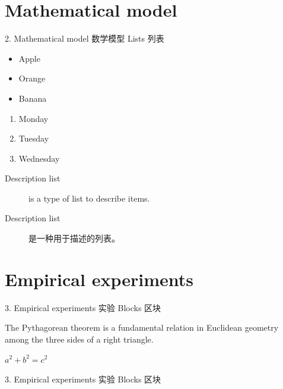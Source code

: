 \documentclass[CJKutf8]{beamer}
\begin{document}
\begin{CJK*}{UTF8}{gbsn}
  \section{Mathematical model}
  \label{Sec:model}
  \begin{frame}{2. Mathematical model 数学模型}
    Lists 列表

    \begin{itemize}
    \item Apple
    \item Orange
    \item Banana
    \end{itemize}

    \begin{enumerate}
    \item Monday
    \item Tuesday
    \item Wednesday
    \end{enumerate}

    \begin{description}
    \item[Description list] is a type of list to describe items.
    \item[Description list] 是一种用于描述的列表。
    \end{description}
  \end{frame} %

  \section{Empirical experiments}
  \label{Sec:experiments}
  \begin{frame}{3. Empirical experiments 实验}
    Blocks 区块

      \begin{definition}
        The Pythagorean theorem is a fundamental relation in Euclidean geometry among the three sides of a right triangle.
      \end{definition}

      \begin{theorem}
        $a^2 + b^2 = c^2$
      \end{theorem}
  \end{frame} %

  \begin{frame}{3. Empirical experiments 实验}
    Blocks 区块


\end{frame}
\end{CJK*}
\end{document}
